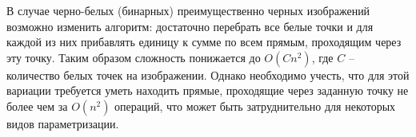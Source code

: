 В случае черно-белых (бинарных) преимущественно черных изображений возможно изменить алгоритм: достаточно перебрать все белые точки и для каждой из них прибавлять единицу к сумме по всем прямым, проходящим через эту точку. Таким образом сложность понижается до $O(Cn^2)$, где $C$ -- количество белых точек на изображении. Однако необходимо учесть, что для этой вариации требуется уметь находить прямые, проходящие через заданную точку не более чем за $O(n^2)$ операций, что может быть затруднительно для некоторых видов параметризации.
